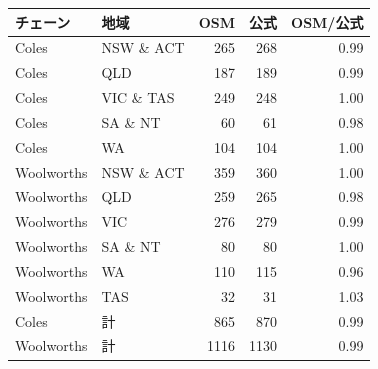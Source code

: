 \begin{tabular}{llrrr}
\toprule
チェーン & 地域 & OSM & 公式 & OSM/公式 \\
\midrule
Coles & NSW \& ACT & 265 & 268 & 0.99 \\
Coles & QLD & 187 & 189 & 0.99 \\
Coles & VIC \& TAS & 249 & 248 & 1.00 \\
Coles & SA \& NT & 60 & 61 & 0.98 \\
Coles & WA & 104 & 104 & 1.00 \\
Woolworths & NSW \& ACT & 359 & 360 & 1.00 \\
Woolworths & QLD & 259 & 265 & 0.98 \\
Woolworths & VIC & 276 & 279 & 0.99 \\
Woolworths & SA \& NT & 80 & 80 & 1.00 \\
Woolworths & WA & 110 & 115 & 0.96 \\
Woolworths & TAS & 32 & 31 & 1.03 \\
\midrule
Coles & 計 & 865 & 870 & 0.99 \\
Woolworths & 計 & 1116 & 1130 & 0.99 \\
\bottomrule
\end{tabular}
